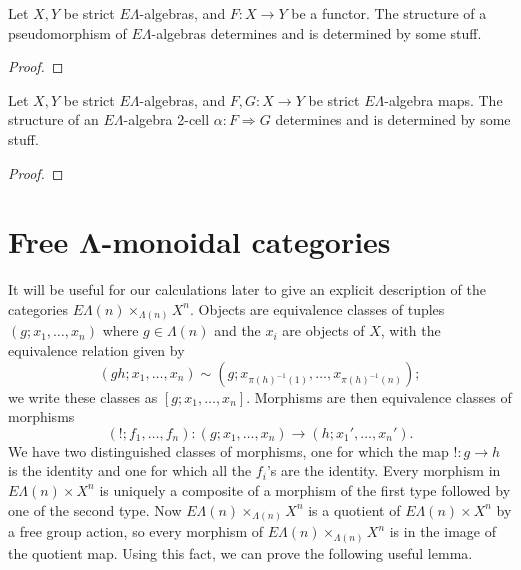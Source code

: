 \documentclass{amsbook} %
\newcommand{\ML}{\mathbf{\Lambda}}
\newcommand{\EL}{E\Lambda}
\numberwithin{section}{chapter}
\begin{document}
\begin{prop}\label{el_weakmap}
Let $X,Y$ be strict $\EL$-algebras, and $F \colon X \to Y$ be a functor. The structure of a pseudomorphism of $\EL$-algebras determines and is determined by some stuff.
\end{prop}
\begin{proof}

\end{proof}

\begin{prop}\label{el_2cells}
Let $X,Y$ be strict $\EL$-algebras, and $F, G \colon X \to Y$ be strict $\EL$-algebra maps. The structure of an $\EL$-algebra 2-cell $\alpha \colon F \Rightarrow G$ determines and is determined by some stuff.
\end{prop}
\begin{proof}

\end{proof}

\section{Free $\ML$-monoidal categories}


It will be useful for our calculations later to give an explicit description of the categories $E\Lambda(n) \times_{\Lambda(n)} X^{n}$.  Objects are equivalence classes of tuples $(g; x_1, \ldots, x_n)$ where $g \in \Lambda(n)$ and the $x_{i}$ are objects of $X$, with the equivalence relation given by
\[
(gh; x_1, \ldots, x_n) \sim (g; x_{\pi(h)^{-1}(1)}, \ldots, x_{\pi(h)^{-1}(n)});
\]
we write these classes as $[g; x_1, \ldots, x_n]$.  Morphisms are then equivalence classes of morphisms
\[
(!; f_1, \ldots, f_n) \colon  (g; x_1, \ldots, x_n) \to (h; x_1', \ldots, x_n').
\]
We have two distinguished classes of morphisms, one for which the map $! \colon  g \to h$ is the identity and one for which all the $f_{i}$'s are the identity.  Every morphism in $E\Lambda(n) \times X^{n}$ is uniquely a composite of a  morphism of the first type followed by one of the second type.  Now $E\Lambda(n) \times_{\Lambda(n)} X^{n}$ is a quotient of $E\Lambda(n) \times X^{n}$ by a free group action, so every morphism of $E\Lambda(n) \times_{\Lambda(n)} X^{n}$ is in the image of the quotient map.  Using this fact, we can prove the following useful lemma.
\end{document}
